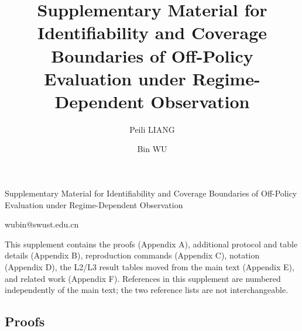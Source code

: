 \documentclass{SCIS2027}
\begin{document}
\raggedbottom   %
\hypertarget{Hfootnote.1}{}

\title{Supplementary Material for Identifiability and Coverage Boundaries of Off-Policy Evaluation under Regime-Dependent Observation}{Supplementary Material for Identifiability and Coverage Boundaries of Off-Policy Evaluation under Regime-Dependent Observation}

\author[1,2]{Peili LIANG}{}
\author[1]{Bin WU}{{wubin@swust.edu.cn}}
\address[1]{School of Information and Control Engineering, Southwest University of Science and Technology, Mianyang 621010, Sichuan, China}
\address[2]{College of Blockchain Industry, Chengdu University of Information Technology, Chengdu 610225, Sichuan, China}

\maketitle

This supplement contains the proofs (Appendix A), additional protocol and table details (Appendix B), reproduction commands (Appendix C), notation (Appendix D), the L2/L3 result tables moved from the main text (Appendix E), and related work (Appendix F). References in this supplement are numbered independently of the main text; the two reference lists are not interchangeable.

\begin{appendix}
\section{Proofs}\label{app:a}


\setcounter{subsection}{2}

\setcounter{subsection}{3}




\FloatBarrier   %


\FloatBarrier   %


\FloatBarrier   %

\end{appendix}

\clearpage


\end{document}
